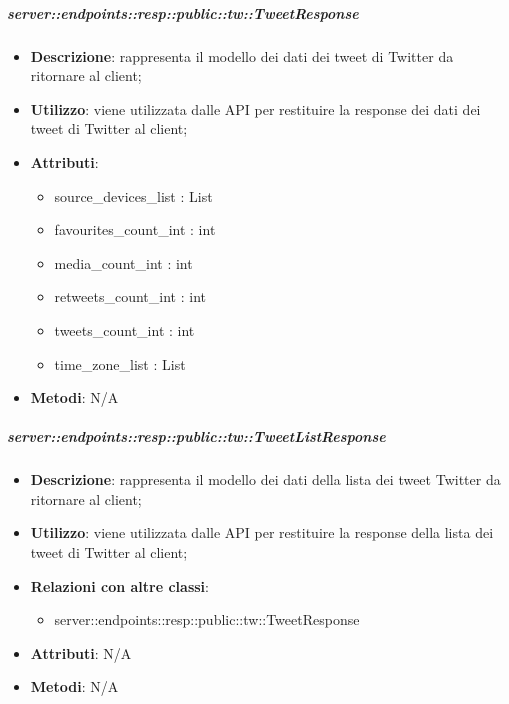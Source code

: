     \subparagraph{server::endpoints::resp::public::tw::TweetResponse} %
    \label{subp:bdsm_app_server_endpoints_resp_public_tw_tweetresponse}
    \begin{itemize}
      \item \textbf{Descrizione}: rappresenta il modello dei dati dei tweet di Twitter da ritornare al client;
      \item \textbf{Utilizzo}: viene utilizzata dalle API per restituire la response dei dati dei tweet di Twitter al client;
      
	  \item \textbf{Attributi}: 
	  	\begin{itemize}
	  		\item source\_devices\_list : List
	  		\item favourites\_count\_int : int
	  		\item media\_count\_int : int
	  		\item retweets\_count\_int : int
	  		\item tweets\_count\_int : int
	  		\item time\_zone\_list : List
	  	\end{itemize}
	  \item \textbf{Metodi}: N/A
    \end{itemize}

    \subparagraph{server::endpoints::resp::public::tw::TweetListResponse} %
    \label{subp:bdsm_app_server_endpoints_resp_public_tw_tweetlistresponse}
    \begin{itemize}
      \item \textbf{Descrizione}: rappresenta il modello dei dati della lista dei tweet Twitter da ritornare al client;
      \item \textbf{Utilizzo}: viene utilizzata dalle API per restituire la response della lista dei tweet di Twitter al client;
      \item \textbf{Relazioni con altre classi}:
        \begin{itemize}
          \item server::endpoints::resp::public::tw::TweetResponse
        \end{itemize}
	  \item \textbf{Attributi}: N/A
	  \item \textbf{Metodi}: N/A
    \end{itemize}

